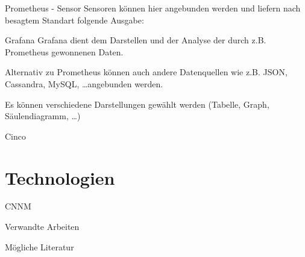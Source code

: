 \documentclass[12pt, pdf, xcolor={table, dvipsnames}, paperheight=8cm,paperwidth=12cm]{beamer}
\begin{document}
\begin{frame}{Prometheus - Sensor}
	Sensoren können hier angebunden werden und liefern nach besagtem Standart folgende Ausgabe:
	
	
\end{frame}

\begin{frame}{Grafana}
	Grafana dient dem Darstellen und der Analyse der durch z.B. Prometheus gewonnenen Daten.
	
	Alternativ zu Prometheus können auch andere Datenquellen wie z.B. JSON, Cassandra, MySQL, \dots angebunden werden.
	
	Es können verschiedene Darstellungen gewählt werden (Tabelle, Graph, Säulendiagramm, \dots)
\end{frame}

\begin{frame}{Cinco}
\end{frame}

\section{Technologien}
\begin{frame}{CNNM}
\end{frame}



\begin{frame}{Verwandte Arbeiten}
\end{frame}

\begin{frame}{Mögliche Literatur}
\end{frame}
\end{document}
